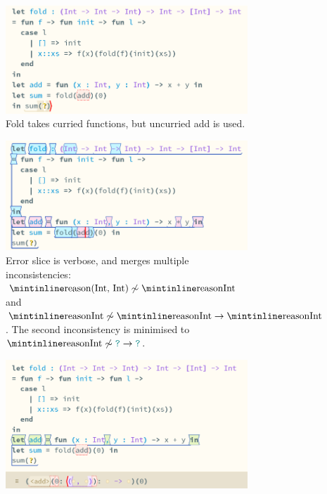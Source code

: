 \begin{figure}[h]
\begin{subfigure}{0.49\textwidth}
\includegraphics[width=1\textwidth]{Media/Figures/curries}
\caption{Fold takes curried functions, but uncurried add is used.}
\end{subfigure}
\begin{subfigure}{0.49\textwidth}
\includegraphics[width=1\textwidth]{Media/Figures/curries_type_slice}
\caption{Error slice is verbose, and merges multiple inconsistencies: $\code{(Int, Int)} \not\sim \code{Int}$ and $\code{Int} \not\sim \code{Int} \to \code{Int}$. The second inconsistency is minimised to $\code{Int} \not\sim \dyn \to \dyn$.}
\end{subfigure}
\begin{subfigure}{0.49\textwidth}
\includegraphics[width=1\textwidth]{Media/Figures/curries_expects_tuple}

\end{subfigure}
\end{figure}

